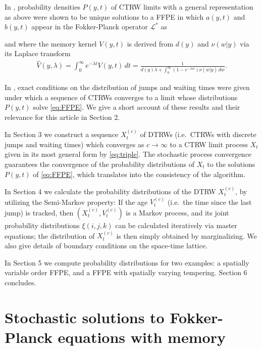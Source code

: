 \documentclass[a4paper,12pt]{elsarticle}
\numberwithin{equation}{section}
\theoremstyle{plain}
\theoremstyle{definition}
\theoremstyle{remark}
\numberwithin{equation}{section}
\newcommand{\1}{\mathbf 1}
\begin{document}
In \citep{BaeumerStraka16}, probability densities $P(y,t)$ of CTRW limits with a general representation as above were shown to be unique solutions to a FFPE
in which $a(y,t)$ and $b(y,t)$ appear in the Fokker-Planck operator
$\mathcal L^*$ as

and where the memory kernel $V(y,t)$ is derived from $d(y)$ and $\nu(w|y)$ via its Laplace transform
\begin{align} \label{eq:LT-renewal-measure}
\hat V(y,\lambda) = \int_0^\infty e^{-\lambda t} V(y,t)\,dt
= \frac{1}{d(y)\lambda + \int_0^\infty (1-e^{-\lambda w})
\nu(w | y)\,dw}.
\end{align}

In \citep{Straka17}, exact conditions on the distribution of jumps and waiting times were given under which a sequence of CTRWs converges to a limit whose distributions $P(y,t)$ solve \eqref{eq:FFPE}.
We give a short account of these results and their relevance for this article in Section 2.

In Section 3 we construct a sequence $X^{(c)}_t$ of DTRWs (i.e.\ CTRWs with discrete jumps and waiting times) which converges as
$c \to \infty$ to a CTRW limit process $X_t$ given in its most general form by \eqref{eq:triple}.  The stochastic process convergence guarantees the convergence of the probability distributions of $X_t$ to the solutions $P(y,t)$ of \eqref{eq:FFPE}, which translates into the consistency of the algorithm.

In Section 4 we calculate the probability distributions of the DTRW $X^{(c)}_t$, by utilizing the Semi-Markov property: If the age $V^{(c)}_t$ (i.e.\ the time since the last jump) is tracked, then
$(X^{(c)}_t, V^{(c)}_t)$ is a Markov process, and its joint probability distributions $\xi(i,j,k)$ can be calculated iteratively via master equations; the distribution of $X^{(c)}_t$ is then simply obtained by marginalizing. We also give details of boundary conditions on the space-time lattice.

In Section 5 we compute probability distributions for two examples: a spatially variable order FFPE, and a FFPE with spatially varying tempering. Section 6 concludes.





\section{Stochastic solutions to Fokker-Planck equations with memory}
\end{document}
